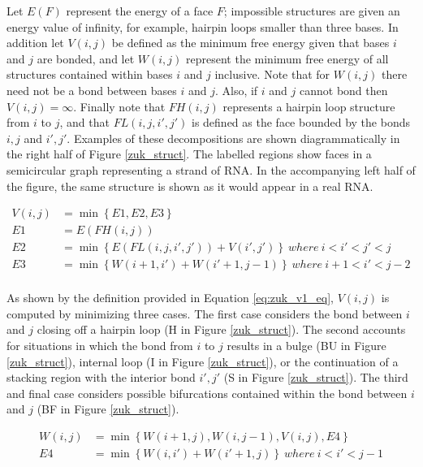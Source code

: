 \documentclass{cshonours}
\begin{document}
Let $E(F)$ represent the energy of a face $F$; impossible structures are given
an energy value of infinity, for example, hairpin loops smaller than three bases. In addition let $V(i, j)$ be defined as the minimum free
energy given that bases $i$ and $j$ are bonded, and let $W(i, j)$ represent
the minimum free energy of all structures contained within bases $i$ and $j$ inclusive.
Note that for $W(i, j)$ there need not be a bond between bases $i$ and $j$. Also,
if $i$ and $j$ cannot bond then $V(i, j) = \infty $. Finally note that $FH(i, j)$ represents a
hairpin loop structure from $i$ to $j$, and that $FL(i, j, i' , j' )$ is defined as the face bounded by the bonds $i, j$ and $i', j'$. Examples of these decompositions are shown
diagrammatically in the right half of Figure \ref{zuk_struct}. The labelled regions show faces
in a semicircular graph representing a strand of RNA. In the accompanying left
half of the figure, the same structure is shown as it would appear in a real
RNA.


\begin{align} \label{eq:zuk_v1_eq}
	V(i, j) &= \min \left\lbrace E1, E2, E3 \right\rbrace \nonumber \\
	E1 &= E(FH(i, j)) \nonumber \\
	E2 &= \min \left\lbrace E(FL(i, j, i', j')) + V (i', j') \right\rbrace \: where \: i < i' < j' < j \nonumber \\
	E3 &= \min \left\lbrace W (i + 1, i') + W (i' + 1, j - 1) \right\rbrace \: where \: i + 1 < i' < j - 2 \nonumber \\
\end{align}


As shown by the definition provided in Equation \ref{eq:zuk_v1_eq}, $V (i, j)$ is computed by minimizing
three cases. The first case considers the bond between $i$ and $j$ closing off a hairpin
loop (H in Figure \ref{zuk_struct}). The second accounts for situations in which the bond from $i$ to $j$ results in a bulge (BU in Figure \ref{zuk_struct}), internal loop (I in Figure \ref{zuk_struct}), or the continuation of a stacking region with the
interior bond $i',j'$ (S in Figure \ref{zuk_struct}). The third and final case considers possible bifurcations contained within the bond between $i$ and $j$ (BF in Figure \ref{zuk_struct}).

\begin{align} \label{eq:zuk_v1_eq2}
	W (i, j) &= \min \left\lbrace W(i + 1, j), W(i, j - 1), V(i, j), E4 \right\rbrace \nonumber \\
	E4 &= \min \left\lbrace W (i, i') + W (i' + 1, j) \right\rbrace \: where \: i < i' < j - 1 \nonumber \\
\end{align}
\end{document}

